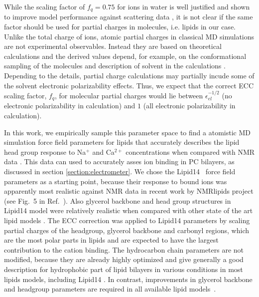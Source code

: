 \documentclass[aip,jcp,twocolumn]{revtex4}
\begin{document}
While the scaling factor of $f_q = 0.75$ for ions in water is well justified and shown
to improve model performance against scattering data \cite{kohagen14,kohagen16, Pluharova2014},
it is not clear if the same factor should be used for partial charges in molecules,
i.e. lipids in our case. Unlike the total charge of ions, atomic partial charges in
classical MD simulations are not experimental observables.
Instead they are based on theoretical calculations and the
derived values depend, for example, on the conformational
sampling of the molecules and description of solvent 
in the calculations \cite{RESP_paper,??}. 
Depending to the details, partial charge calculations may partially
incude some of the solvent electronic polarizability effects. Thus, we expect that
the correct ECC scaling factor, $f_q$, for molecular partial charges would lie
between $\epsilon _{el} ^{-1/2}$ (no electronic polarizability in calculation)
and $1$ (all electronic polarizability in calculation).

In this work, we empirically sample this parameter space
to find a atomistic MD simulation force field parameters for lipids that
accurately describes the lipid head group response to Na$^+$ and Ca$^{2+}$ concentrations
when compared with NMR data \cite{catte16}. This data can used to accurately asses
ion binding in PC bilayers, as discussed in section \ref{section:electrometer}.
We chose the Lipid14~\cite{dickson14} force field parameters as a starting point,
because their response to bound ions was apparently most realistic against NMR data
in recent work by NMRlipids project (see Fig.~5 in Ref.~).
Also glycerol backbone and head group structures in Lipid14 model were
relatively realistic when compared with other state of the art lipid models \cite{botan15}.
The ECC correction was applied to Lipid14 parameters by scaling partial charges of the headgroup,
glycerol backbone and carbonyl regions, which are the most polar parts in lipids and
are expected to have the largest contribution to the cation binding.
The hydrocarbon chain parameters are not modified, because they are
already highly optimized and give generally a good description for
hydrophobic part of lipid bilayers in various conditions
in most lipids models, including Lipid14 \cite{ollila16}.
In contrast, improvements in glycerol backbone and headgroup
parameters are required in all available lipid models~\cite{botan15}. 
\end{document}
